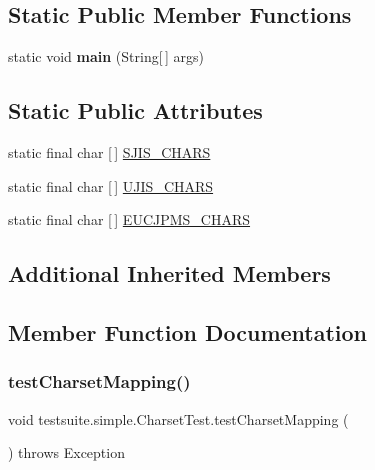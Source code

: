 \subsection*{Static Public Member Functions}
\begin{DoxyCompactItemize}
\item 
\mbox{\label{classtestsuite_1_1simple_1_1_charset_test_a3413e56bcb53af4a9f65a650fb408b47}} 
static void {\bfseries main} (String\mbox{[}$\,$\mbox{]} args)
\end{DoxyCompactItemize}
\subsection*{Static Public Attributes}
\begin{DoxyCompactItemize}
\item 
static final char \mbox{[}$\,$\mbox{]} \mbox{\hyperlink{classtestsuite_1_1simple_1_1_charset_test_aea9e321b4ce55b3fe366d39ac69da267}{S\+J\+I\+S\+\_\+\+C\+H\+A\+RS}}
\item 
static final char \mbox{[}$\,$\mbox{]} \mbox{\hyperlink{classtestsuite_1_1simple_1_1_charset_test_afdb55a8c00071fb31c3b37c660d8ba3c}{U\+J\+I\+S\+\_\+\+C\+H\+A\+RS}}
\item 
static final char \mbox{[}$\,$\mbox{]} \mbox{\hyperlink{classtestsuite_1_1simple_1_1_charset_test_aa9c89e77068a2f7b4361d9dd6b00f5ac}{E\+U\+C\+J\+P\+M\+S\+\_\+\+C\+H\+A\+RS}}
\end{DoxyCompactItemize}
\subsection*{Additional Inherited Members}


\subsection{Member Function Documentation}
\mbox{\label{classtestsuite_1_1simple_1_1_charset_test_ace6046bed9bc3e29734e98003258fd58}} 
\subsubsection{\texorpdfstring{test\+Charset\+Mapping()}{testCharsetMapping()}}
{\footnotesize\ttfamily void testsuite.\+simple.\+Charset\+Test.\+test\+Charset\+Mapping (\begin{DoxyParamCaption}{ }\end{DoxyParamCaption}) throws Exception}

